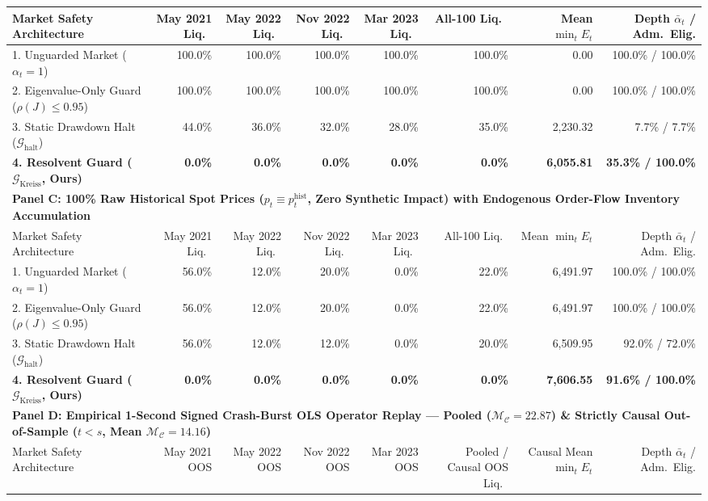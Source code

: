 \begin{table}[htbp]
{\begin{tabular}{lrrrrrrr}
\midrule
Market Safety Architecture & May 2021 Liq.\ & May 2022 Liq.\ & Nov 2022 Liq.\ & Mar 2023 Liq.\ & All-100 Liq.\ & Mean $\min_t E_t$ & Depth $\bar{\alpha}_t$ / Adm.\ Elig. \\
\midrule
1. Unguarded Market ($\alpha_t = 1$) & 100.0\% & 100.0\% & 100.0\% & 100.0\% & 100.0\% & 0.00 & 100.0\% / 100.0\% \\
2. Eigenvalue-Only Guard ($\rho(J) \le 0.95$) & 100.0\% & 100.0\% & 100.0\% & 100.0\% & 100.0\% & 0.00 & 100.0\% / 100.0\% \\
3. Static Drawdown Halt ($\mathcal{G}_{\mathrm{halt}}$) & 44.0\% & 36.0\% & 32.0\% & 28.0\% & 35.0\% & 2,230.32 & 7.7\% / 7.7\% \\
\textbf{4. Resolvent Guard ($\mathcal{G}_{\mathrm{Kreiss}}$, Ours)} & \textbf{0.0\%} & \textbf{0.0\%} & \textbf{0.0\%} & \textbf{0.0\%} & \textbf{0.0\%} & \textbf{6,055.81} & \textbf{35.3\% / 100.0\%} \\
\midrule
\multicolumn{8}{l}{\textbf{Panel C: 100\% Raw Historical Spot Prices ($p_t \equiv p_t^{\mathrm{hist}}$, Zero Synthetic Impact) with Endogenous Order-Flow Inventory Accumulation}} \\
\midrule
Market Safety Architecture & May 2021 Liq.\ & May 2022 Liq.\ & Nov 2022 Liq.\ & Mar 2023 Liq.\ & All-100 Liq.\ & Mean $\min_t E_t$ & Depth $\bar{\alpha}_t$ / Adm.\ Elig. \\
\midrule
1. Unguarded Market ($\alpha_t = 1$) & 56.0\% & 12.0\% & 20.0\% & 0.0\% & 22.0\% & 6,491.97 & 100.0\% / 100.0\% \\
2. Eigenvalue-Only Guard ($\rho(J) \le 0.95$) & 56.0\% & 12.0\% & 20.0\% & 0.0\% & 22.0\% & 6,491.97 & 100.0\% / 100.0\% \\
3. Static Drawdown Halt ($\mathcal{G}_{\mathrm{halt}}$) & 56.0\% & 12.0\% & 12.0\% & 0.0\% & 20.0\% & 6,509.95 & 92.0\% / 72.0\% \\
\textbf{4. Resolvent Guard ($\mathcal{G}_{\mathrm{Kreiss}}$, Ours)} & \textbf{0.0\%} & \textbf{0.0\%} & \textbf{0.0\%} & \textbf{0.0\%} & \textbf{0.0\%} & \textbf{7,606.55} & \textbf{91.6\% / 100.0\%} \\
\midrule
\multicolumn{8}{l}{\textbf{Panel D: Empirical 1-Second Signed Crash-Burst OLS Operator Replay — Pooled ($\mathcal{M}_{\mathcal{C}}=22.87$) \& Strictly Causal Out-of-Sample ($t<s$, Mean $\mathcal{M}_{\mathcal{C}}=14.16$)}} \\
\midrule
Market Safety Architecture & May 2021 OOS & May 2022 OOS & Nov 2022 OOS & Mar 2023 OOS & Pooled / Causal OOS Liq.\ & Causal Mean $\min_t E_t$ & Depth $\bar{\alpha}_t$ / Adm.\ Elig. \\

\end{tabular}}
\end{table}
